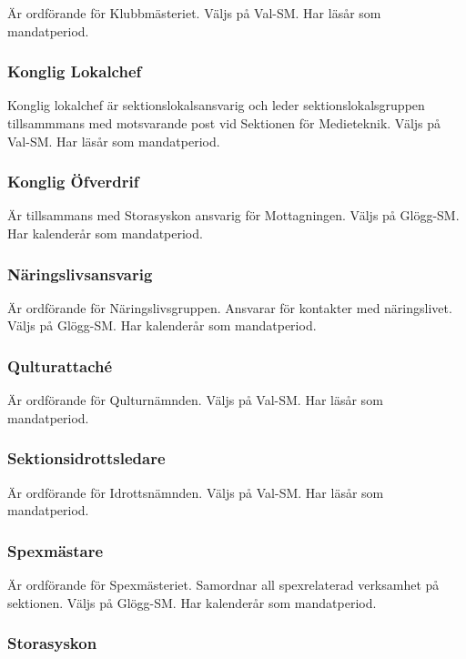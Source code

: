 \documentclass{dgovdoc}
\begin{document}
Är ordförande för Klubbmästeriet. Väljs på Val-SM. Har läsår som mandatperiod.

\subsubsection{Konglig Lokalchef}

Konglig lokalchef är sektionslokalsansvarig och leder sektionslokalsgruppen tillsammmans med motsvarande post vid Sektionen för Medieteknik. Väljs på Val-SM. Har läsår som mandatperiod.

\subsubsection{Konglig Öfverdrif}

Är tillsammans med Storasyskon ansvarig för Mottagningen.
Väljs på Glögg-SM. Har kalenderår som mandatperiod.

\subsubsection{Näringslivsansvarig}

Är ordförande för Näringslivsgruppen. Ansvarar för kontakter med näringslivet.
Väljs på Glögg-SM. Har kalenderår som mandatperiod.

\subsubsection{Qulturattaché}

Är ordförande för Qulturnämnden. Väljs på Val-SM. Har läsår som mandatperiod.

\subsubsection{Sektionsidrottsledare}

Är ordförande för Idrottsnämnden. Väljs på Val-SM. Har läsår som mandatperiod.

\subsubsection{Spexmästare}

Är ordförande för Spexmästeriet. Samordnar all spexrelaterad verksamhet på sektionen.
Väljs på Glögg-SM. Har kalenderår som mandatperiod.

\subsubsection{Storasyskon}
\end{document}
